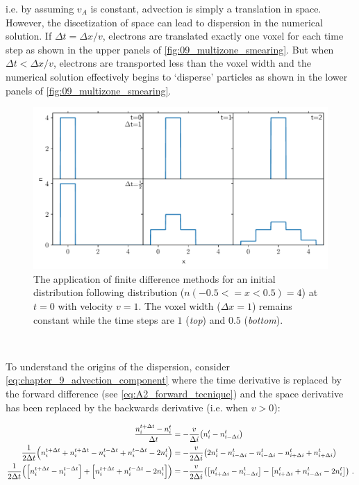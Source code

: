 \noindent i.e. by assuming $v_A$ is constant, advection is simply a translation in space. However, the discetization of space can lead to dispersion in the numerical solution. If $\Delta t = \Delta x/v$, electrons are translated exactly one voxel for each time step as shown in the upper panels of \autoref{fig:09_multizone_smearing}. But when $\Delta t < \Delta x/v$, electrons are transported less than the voxel width and the numerical solution effectively begins to `disperse' particles as shown in the lower panels of \autoref{fig:09_multizone_smearing}.
\begin{figure}[h!]
    \centering
    \includegraphics[width=\textwidth]{09_Multizone/Images/advection/advection_smearing.pdf}
    \caption{The application of finite difference methods for an initial distribution following distribution ($n(-0.5<=x<0.5)=4$) at $t=0$ with velocity $v=1$. The voxel width ($\Delta x=1$) remains constant while the time steps are $1$ (\textit{top}) and $0.5$ (\textit{bottom}).}
    \label{fig:09_multizone_smearing}
\end{figure}
\par~\par 
To understand the origins of the dispersion, consider \autoref{eq:chapter_9_advection_component} where the time derivative is replaced by the forward difference (see \autoref{eq:A2_forward_tecnique}) and the space derivative has been replaced by the backwards derivative (i.e. when $v>0$):

\begin{equation}
    \begin{aligned}
        \frac{n_i^{t+\Delta t}-n_{i}^{t}}{\Delta t}&=-\frac{v}{\Delta i} \qty(n_{i}^t-n_{i-\Delta i}^t)\\
        \frac{1}{2\Delta t} \qty(n_{i}^{t+\Delta t}+n_{i}^{t+\Delta t}-n_{i}^{t-\Delta t}+n_{i}^{t-\Delta t}-2n_{i}^{t}) &=-\frac{v}{2\Delta i} \qty(2n_{i}^t-n_{i-\Delta i}^t-n_{i-\Delta i}^t-n_{i+\Delta i}^t+n_{i+\Delta i}^t) \\
        \frac{1}{2\Delta t}\qty(\qty[n_{i}^{t+\Delta t}-n_{i}^{t-\Delta t}]+\qty[n_{i}^{t+\Delta t}+n_{i}^{t-\Delta t}-2n_{i}^{t}])&=-\frac{v}{2\Delta i} \qty(\qty[n_{i+\Delta i}^t-n_{i-\Delta i}^t]-\qty[n_{i+\Delta i}^t+n_{i-\Delta i}^t-2n_{i}^t]) \text{ .} 
    \end{aligned} \label{eq:09_multizone_dispersion_ex}
\end{equation}

